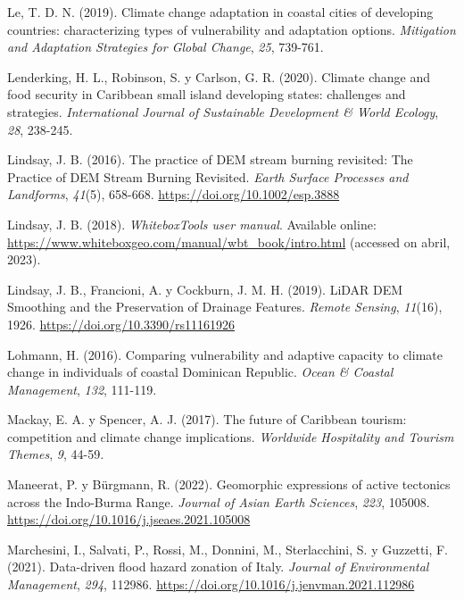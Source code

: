 \documentclass[spanish]{article}
\newlength{\cslhangindent}
\newlength{\cslentryspacingunit} %
\newenvironment{CSLReferences}[2] %
 {%
  \setlength{\parindent}{0pt}
  \ifodd #1
  \let\oldpar\par
  \def\par{\hangindent=\cslhangindent\oldpar}
  \fi
  \setlength{\parskip}{#2\cslentryspacingunit}
 }%
 {}
\begin{document}
\begin{CSLReferences}{1}{0}
\leavevmode{}%
Le, T. D. N. (2019). Climate change adaptation in coastal cities of
developing countries: characterizing types of vulnerability and
adaptation options. \emph{Mitigation and Adaptation Strategies for
Global Change}, \emph{25}, 739-761.

\leavevmode{}%
Lenderking, H. L., Robinson, S. y Carlson, G. R. (2020). Climate change
and food security in Caribbean small island developing states:
challenges and strategies. \emph{International Journal of Sustainable
Development \& World Ecology}, \emph{28}, 238-245.

\leavevmode{}%
Lindsay, J. B. (2016). The practice of DEM stream burning revisited: The
Practice of DEM Stream Burning Revisited. \emph{Earth Surface Processes
and Landforms}, \emph{41}(5), 658-668.
\url{https://doi.org/10.1002/esp.3888}

\leavevmode{}%
Lindsay, J. B. (2018). \emph{{WhiteboxTools user manual}}. Available
online: \url{https://www.whiteboxgeo.com/manual/wbt_book/intro.html}
(accessed on abril, 2023).

\leavevmode{}%
Lindsay, J. B., Francioni, A. y Cockburn, J. M. H. (2019). LiDAR DEM
Smoothing and the Preservation of Drainage Features. \emph{Remote
Sensing}, \emph{11}(16), 1926. \url{https://doi.org/10.3390/rs11161926}

\leavevmode{}%
Lohmann, H. (2016). Comparing vulnerability and adaptive capacity to
climate change in individuals of coastal Dominican Republic. \emph{Ocean
\& Coastal Management}, \emph{132}, 111-119.

\leavevmode{}%
Mackay, E. A. y Spencer, A. J. (2017). The future of Caribbean tourism:
competition and climate change implications. \emph{Worldwide Hospitality
and Tourism Themes}, \emph{9}, 44-59.

\leavevmode{}%
Maneerat, P. y Bürgmann, R. (2022). Geomorphic expressions of active
tectonics across the {Indo}-{Burma} {Range}. \emph{Journal of Asian
Earth Sciences}, \emph{223}, 105008.
\url{https://doi.org/10.1016/j.jseaes.2021.105008}

\leavevmode{}%
Marchesini, I., Salvati, P., Rossi, M., Donnini, M., Sterlacchini, S. y
Guzzetti, F. (2021). Data-driven flood hazard zonation of Italy.
\emph{Journal of Environmental Management}, \emph{294}, 112986.
\url{https://doi.org/10.1016/j.jenvman.2021.112986}


\end{CSLReferences}
\end{document}
